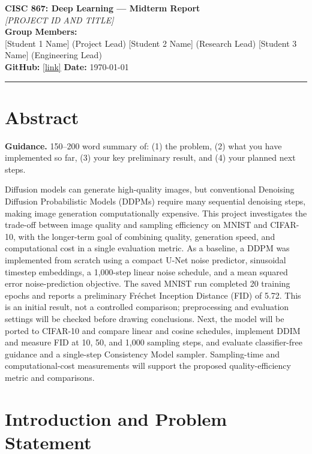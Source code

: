 \documentclass[11pt, letterpaper]{article}
\begin{document}
{\centering
  {\Large\textbf{CISC 867: Deep Learning --- Midterm Report}}\\[0.5em]
  {\large\textit{[PROJECT ID AND TITLE]}}\\[0.4em]
  \textbf{Group Members:}\\
  {[Student 1 Name]} (Project Lead) \quad
  {[Student 2 Name]} (Research Lead) \quad
  {[Student 3 Name]} (Engineering Lead)\\[0.3em]
  \textbf{GitHub:} \url{[link]} \quad \textbf{Date:} \today\\[0.4em]
  \rule{\linewidth}{0.4pt}
}

\section{Abstract}

\begin{guidancebox}
\textbf{Guidance.} 150--200 word summary of: (1) the problem, (2) what you have
implemented so far, (3) your key preliminary result, and (4) your planned next steps.
\end{guidancebox}

Diffusion models can generate high-quality images, but conventional Denoising Diffusion Probabilistic Models (DDPMs) require many sequential denoising steps, making image generation computationally expensive. This project investigates the trade-off between image quality and sampling efficiency on MNIST and CIFAR-10, with the longer-term goal of combining quality, generation speed, and computational cost in a single evaluation metric. As a baseline, a DDPM was implemented from scratch using a compact U-Net noise predictor, sinusoidal timestep embeddings, a 1,000-step linear noise schedule, and a mean squared error noise-prediction objective. The saved MNIST run completed 20 training epochs and reports a preliminary Fr\'echet Inception Distance (FID) of 5.72. This is an initial result, not a controlled comparison; preprocessing and evaluation settings will be checked before drawing conclusions. Next, the model will be ported to CIFAR-10 and compare linear and cosine schedules, implement DDIM and measure FID at 10, 50, and 1,000 sampling steps, and evaluate classifier-free guidance and a single-step Consistency Model sampler. Sampling-time and computational-cost measurements will support the proposed quality-efficiency metric and comparisons.


\section{Introduction and Problem Statement}
\end{document}

